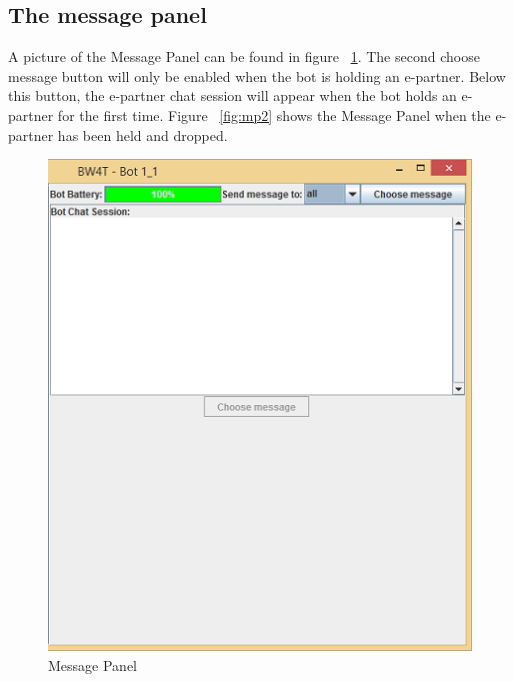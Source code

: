 \subsection{The message panel}
A picture of the Message Panel can be found in figure ~\ref{fig:mp1}. The second choose message button will only be enabled when the bot is holding an e-partner. Below this button, the e-partner chat session will appear when the bot holds an e-partner for the first time. Figure ~\ref{fig:mp2} shows the Message Panel when the e-partner has been held and dropped.
\\
\begin{figure}[h]
\begin{center}
\includegraphics{HumanPlayerGUI/hpg-right.png}
\end{center}
\caption{Message Panel}
\label{fig:mp1}
\end{figure}

